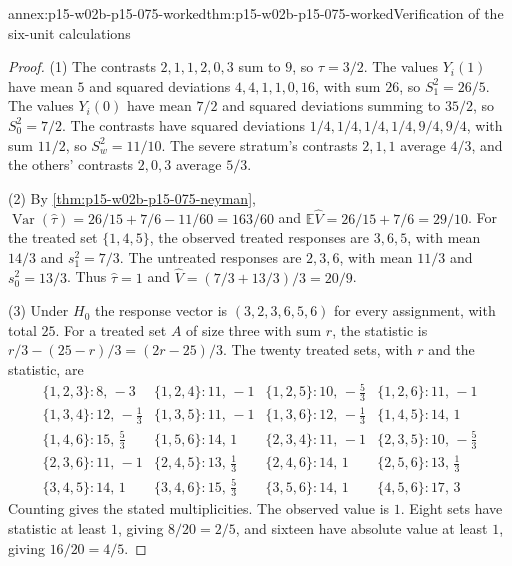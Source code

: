 \begin{annexitem}{annex:p15-w02b-p15-075-worked}{thm:p15-w02b-p15-075-worked}{Verification of the six-unit calculations}
\begin{proof}
(1) The contrasts \(2,1,1,2,0,3\) sum to \(9\), so \(\tau=3/2\). The values
\(Y_i(1)\) have mean \(5\) and squared deviations \(4,4,1,1,0,16\), with sum
\(26\), so \(S_1^2=26/5\). The values \(Y_i(0)\) have mean \(7/2\) and
squared deviations summing to \(35/2\), so \(S_0^2=7/2\). The contrasts have
squared deviations \(1/4,1/4,1/4,1/4,9/4,9/4\), with sum \(11/2\), so
\(S_w^2=11/10\). The severe stratum's contrasts \(2,1,1\) average
\(4/3\), and the others' contrasts \(2,0,3\) average \(5/3\).

(2) By \cref{thm:p15-w02b-p15-075-neyman},
\(\operatorname{Var}(\widehat\tau)=26/15+7/6-11/60=163/60\) and
\(\mathbb E\widehat V=26/15+7/6=29/10\). For the treated set \(\{1,4,5\}\),
the observed treated responses are \(3,6,5\), with mean \(14/3\) and
\(s_1^2=7/3\). The untreated responses are \(2,3,6\), with mean \(11/3\) and
\(s_0^2=13/3\). Thus \(\widehat\tau=1\) and
\(\widehat V=(7/3+13/3)/3=20/9\).

(3) Under \(H_0\) the response vector is \((3,2,3,6,5,6)\) for every
assignment, with total \(25\). For a treated set \(A\) of size three with sum
\(r\), the statistic is \(r/3-(25-r)/3=(2r-25)/3\). The twenty treated sets,
with \(r\) and the statistic, are
\[
\begin{array}{llll}
\{1,2,3\}:8,\,-3 & \{1,2,4\}:11,\,-1 & \{1,2,5\}:10,\,-\tfrac53 & \{1,2,6\}:11,\,-1\\
\{1,3,4\}:12,\,-\tfrac13 & \{1,3,5\}:11,\,-1 & \{1,3,6\}:12,\,-\tfrac13 & \{1,4,5\}:14,\,1\\
\{1,4,6\}:15,\,\tfrac53 & \{1,5,6\}:14,\,1 & \{2,3,4\}:11,\,-1 & \{2,3,5\}:10,\,-\tfrac53\\
\{2,3,6\}:11,\,-1 & \{2,4,5\}:13,\,\tfrac13 & \{2,4,6\}:14,\,1 & \{2,5,6\}:13,\,\tfrac13\\
\{3,4,5\}:14,\,1 & \{3,4,6\}:15,\,\tfrac53 & \{3,5,6\}:14,\,1 & \{4,5,6\}:17,\,3
\end{array}
\]
Counting gives the stated multiplicities. The observed value is \(1\). Eight
sets have statistic at least \(1\), giving \(8/20=2/5\), and sixteen have
absolute value at least \(1\), giving \(16/20=4/5\).


\end{proof}
\end{annexitem}
